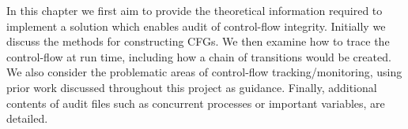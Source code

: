 In this chapter we first aim to provide the theoretical information required to implement a solution which enables audit of control-flow integrity. Initially we discuss the methods for constructing CFGs. We then examine how to trace the control-flow at run time, including how a chain of transitions would be created. We also consider the problematic areas of control-flow tracking\slash monitoring, using prior work discussed throughout this project as guidance. Finally, additional contents of audit files such as concurrent processes or important variables, are detailed.